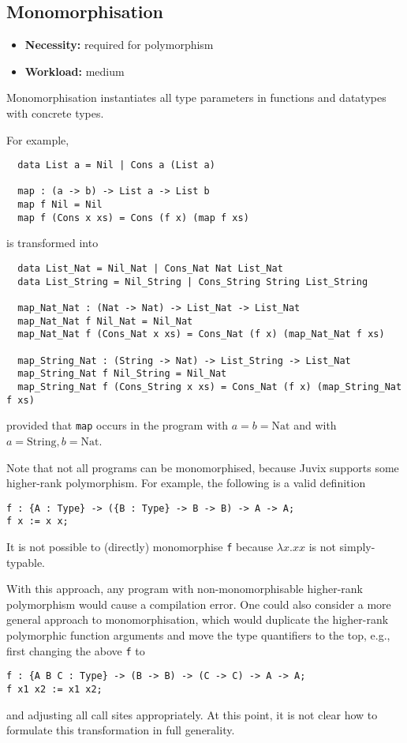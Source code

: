 \documentclass[
    9pt,            %
    techreport,        %
    affiltop,       %
]{art}
\begin{document}
\subsection{Monomorphisation}

\begin{itemize}
\item {\bf Necessity:} required for polymorphism
\item {\bf Workload:} medium
\end{itemize}

\noindent Monomorphisation instantiates all type parameters in
functions and datatypes with concrete types.

\medskip

\noindent For example,
\begin{verbatim}
  data List a = Nil | Cons a (List a)

  map : (a -> b) -> List a -> List b
  map f Nil = Nil
  map f (Cons x xs) = Cons (f x) (map f xs)
\end{verbatim}
is transformed into
\begin{verbatim}
  data List_Nat = Nil_Nat | Cons_Nat Nat List_Nat
  data List_String = Nil_String | Cons_String String List_String

  map_Nat_Nat : (Nat -> Nat) -> List_Nat -> List_Nat
  map_Nat_Nat f Nil_Nat = Nil_Nat
  map_Nat_Nat f (Cons_Nat x xs) = Cons_Nat (f x) (map_Nat_Nat f xs)

  map_String_Nat : (String -> Nat) -> List_String -> List_Nat
  map_String_Nat f Nil_String = Nil_Nat
  map_String_Nat f (Cons_String x xs) = Cons_Nat (f x) (map_String_Nat f xs)
\end{verbatim}
provided that \texttt{map} occurs in the program with $a = b =
\mathrm{Nat}$ and with $a = \mathrm{String}, b = \mathrm{Nat}$.

\medskip

Note that not all \Juvix{} programs can be monomorphised, because Juvix
supports some higher-rank polymorphism. For example, the following is
a valid \Juvix{} definition
\begin{verbatim}
f : {A : Type} -> ({B : Type} -> B -> B) -> A -> A;
f x := x x;
\end{verbatim}
It is not possible to (directly) monomorphise \texttt{f} because
$\lambda x . x x$ is not simply-typable.

With this approach, any program with non-monomorphisable higher-rank
polymorphism would cause a compilation error. One could also consider
a more general approach to monomorphisation, which would duplicate the
higher-rank polymorphic function arguments and move the type
quantifiers to the top, e.g., first changing the above \texttt{f} to
\begin{verbatim}
f : {A B C : Type} -> (B -> B) -> (C -> C) -> A -> A;
f x1 x2 := x1 x2;
\end{verbatim}
and adjusting all call sites appropriately. At this point, it is not clear how to formulate this transformation in full generality.
\end{document}
